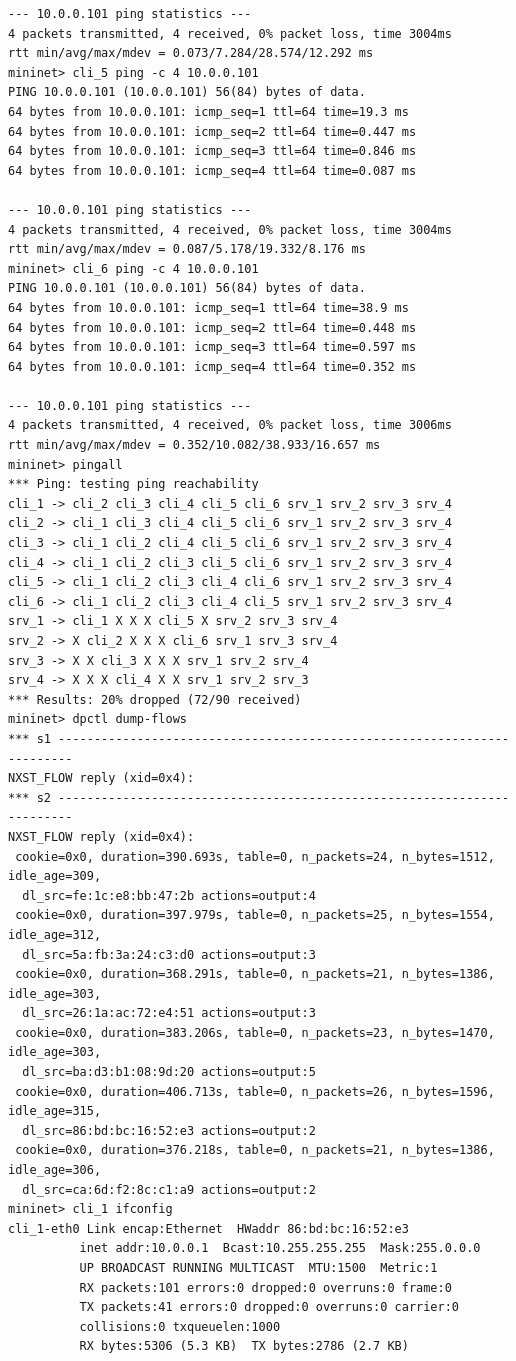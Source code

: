 \documentclass{article}
\begin{document}
\begin{Verbatim}
--- 10.0.0.101 ping statistics ---
4 packets transmitted, 4 received, 0% packet loss, time 3004ms
rtt min/avg/max/mdev = 0.073/7.284/28.574/12.292 ms
mininet> cli_5 ping -c 4 10.0.0.101
PING 10.0.0.101 (10.0.0.101) 56(84) bytes of data.
64 bytes from 10.0.0.101: icmp_seq=1 ttl=64 time=19.3 ms
64 bytes from 10.0.0.101: icmp_seq=2 ttl=64 time=0.447 ms
64 bytes from 10.0.0.101: icmp_seq=3 ttl=64 time=0.846 ms
64 bytes from 10.0.0.101: icmp_seq=4 ttl=64 time=0.087 ms

--- 10.0.0.101 ping statistics ---
4 packets transmitted, 4 received, 0% packet loss, time 3004ms
rtt min/avg/max/mdev = 0.087/5.178/19.332/8.176 ms
mininet> cli_6 ping -c 4 10.0.0.101
PING 10.0.0.101 (10.0.0.101) 56(84) bytes of data.
64 bytes from 10.0.0.101: icmp_seq=1 ttl=64 time=38.9 ms
64 bytes from 10.0.0.101: icmp_seq=2 ttl=64 time=0.448 ms
64 bytes from 10.0.0.101: icmp_seq=3 ttl=64 time=0.597 ms
64 bytes from 10.0.0.101: icmp_seq=4 ttl=64 time=0.352 ms

--- 10.0.0.101 ping statistics ---
4 packets transmitted, 4 received, 0% packet loss, time 3006ms
rtt min/avg/max/mdev = 0.352/10.082/38.933/16.657 ms
mininet> pingall
*** Ping: testing ping reachability
cli_1 -> cli_2 cli_3 cli_4 cli_5 cli_6 srv_1 srv_2 srv_3 srv_4
cli_2 -> cli_1 cli_3 cli_4 cli_5 cli_6 srv_1 srv_2 srv_3 srv_4
cli_3 -> cli_1 cli_2 cli_4 cli_5 cli_6 srv_1 srv_2 srv_3 srv_4
cli_4 -> cli_1 cli_2 cli_3 cli_5 cli_6 srv_1 srv_2 srv_3 srv_4
cli_5 -> cli_1 cli_2 cli_3 cli_4 cli_6 srv_1 srv_2 srv_3 srv_4
cli_6 -> cli_1 cli_2 cli_3 cli_4 cli_5 srv_1 srv_2 srv_3 srv_4
srv_1 -> cli_1 X X X cli_5 X srv_2 srv_3 srv_4
srv_2 -> X cli_2 X X X cli_6 srv_1 srv_3 srv_4
srv_3 -> X X cli_3 X X X srv_1 srv_2 srv_4
srv_4 -> X X X cli_4 X X srv_1 srv_2 srv_3
*** Results: 20% dropped (72/90 received)
mininet> dpctl dump-flows
*** s1 ------------------------------------------------------------------------
NXST_FLOW reply (xid=0x4):
*** s2 ------------------------------------------------------------------------
NXST_FLOW reply (xid=0x4):
 cookie=0x0, duration=390.693s, table=0, n_packets=24, n_bytes=1512, idle_age=309,
  dl_src=fe:1c:e8:bb:47:2b actions=output:4
 cookie=0x0, duration=397.979s, table=0, n_packets=25, n_bytes=1554, idle_age=312,
  dl_src=5a:fb:3a:24:c3:d0 actions=output:3
 cookie=0x0, duration=368.291s, table=0, n_packets=21, n_bytes=1386, idle_age=303,
  dl_src=26:1a:ac:72:e4:51 actions=output:3
 cookie=0x0, duration=383.206s, table=0, n_packets=23, n_bytes=1470, idle_age=303,
  dl_src=ba:d3:b1:08:9d:20 actions=output:5
 cookie=0x0, duration=406.713s, table=0, n_packets=26, n_bytes=1596, idle_age=315,
  dl_src=86:bd:bc:16:52:e3 actions=output:2
 cookie=0x0, duration=376.218s, table=0, n_packets=21, n_bytes=1386, idle_age=306,
  dl_src=ca:6d:f2:8c:c1:a9 actions=output:2
mininet> cli_1 ifconfig
cli_1-eth0 Link encap:Ethernet  HWaddr 86:bd:bc:16:52:e3
          inet addr:10.0.0.1  Bcast:10.255.255.255  Mask:255.0.0.0
          UP BROADCAST RUNNING MULTICAST  MTU:1500  Metric:1
          RX packets:101 errors:0 dropped:0 overruns:0 frame:0
          TX packets:41 errors:0 dropped:0 overruns:0 carrier:0
          collisions:0 txqueuelen:1000
          RX bytes:5306 (5.3 KB)  TX bytes:2786 (2.7 KB)


\end{Verbatim}
\end{document}
